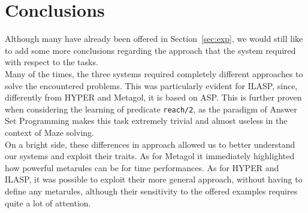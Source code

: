 \section{Conclusions}\label{sec:conc}
Although many have already been offered in Section~\ref{sec:exp},
we would still like to add some more conclusions regarding the approach
that the system required with respect to the tasks.\\
Many of the times, the three systems required completely different approaches
to solve the encountered problems. This was particularly evident for ILASP, since,
differently from HYPER and Metagol, it is based on ASP. This is further proven when
considering the learning of predicate \texttt{reach/2}, as the paradigm of Answer Set
Programming makes this task extremely trivial and almost useless in the context of
Maze solving.\\
On a bright side, these differences in approach allowed us to better understand our
systems and exploit their traits. As for Metagol it immediately highlighted how powerful metarules can be for
time performances. As for HYPER and ILASP, it was possible to exploit their more general approach,
without having to define any metarules, although their sensitivity to the offered examples requires
quite a lot of attention.

